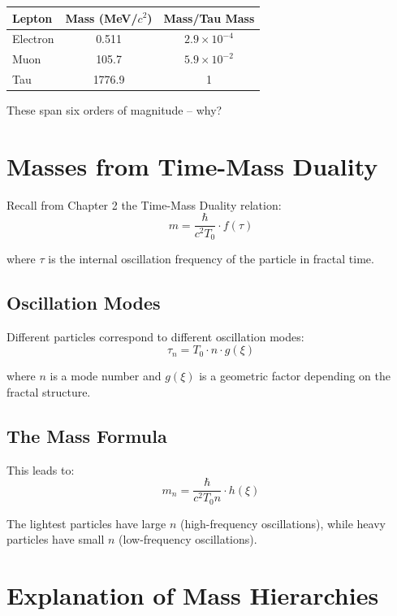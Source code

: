 \begin{tabular}{lcc}
\hline
Lepton & Mass (MeV/$c^2$) & Mass/Tau Mass \\
\hline
Electron & 0.511 & $2.9 \times 10^{-4}$ \\
Muon & 105.7 & $5.9 \times 10^{-2}$ \\
Tau & 1776.9 & 1 \\
\hline
\end{tabular}

These span six orders of magnitude -- why?

\section{Masses from Time-Mass Duality}

Recall from Chapter 2 the Time-Mass Duality relation:
\begin{equation}
m = \frac{\hbar}{c^2 T_0} \cdot f(\tau)
\end{equation}

where $\tau$ is the internal oscillation frequency of the particle in fractal time.

\subsection{Oscillation Modes}

Different particles correspond to different oscillation modes:
\begin{equation}
\tau_n = T_0 \cdot n \cdot g(\xi)
\end{equation}

where $n$ is a mode number and $g(\xi)$ is a geometric factor depending on the fractal structure.

\subsection{The Mass Formula}

This leads to:
\begin{equation}
m_n = \frac{\hbar}{c^2 T_0 n} \cdot h(\xi)
\end{equation}

The lightest particles have large $n$ (high-frequency oscillations), while heavy particles have small $n$ (low-frequency oscillations).

\section{Explanation of Mass Hierarchies}

